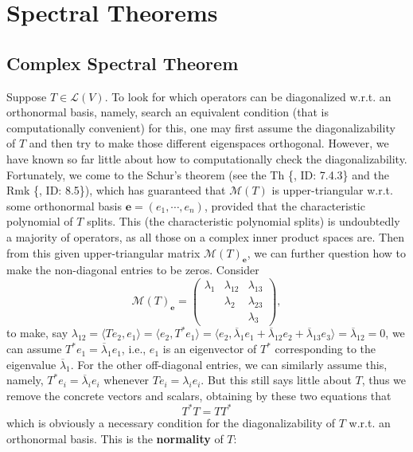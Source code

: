\documentclass{article}
\begin{document}
\section{Spectral Theorems}
\subsection{Complex Spectral Theorem}
Suppose $T\in\mathcal{L}(V)$. To look for which operators can be diagonalized w.r.t. an orthonormal basis, namely, search an equivalent condition (that is computationally convenient) for this, one may first assume the diagonalizability of $T$ and then try to make those different eigenspaces orthogonal. However, we have known so far little about how to computationally check the diagonalizability. Fortunately, we come to the Schur's theorem (see the Th \{, ID: 7.4.3\} and the Rmk \{, ID: 8.5\}), which has guaranteed that $\mathcal{M}(T)$ is upper-triangular w.r.t. some orthonormal basis $\pmb{e} = (e_1,\cdots,e_n)$, provided that the characteristic polynomial of $T$ splits. This (the characteristic polynomial splits) is undoubtedly a majority of operators, as all those on a complex inner product spaces are. Then from this given upper-triangular matrix $\mathcal{M}(T)_{\pmb{e}}$, we can further question how to make the non-diagonal entries to be zeros. Consider
\begin{equation}
    \mathcal{M}(T)_{\pmb{e}} = \begin{pmatrix}
        \lambda_1 & \lambda_{12} & \lambda_{13} \\
         & \lambda_2 & \lambda_{23} \\
         & & \lambda_3
    \end{pmatrix},
\end{equation}
to make, say $\lambda_{12} = \langle Te_2, e_1\rangle = \langle e_2, T^*e_1\rangle = \langle e_2, \overline{\lambda}_1e_1+\overline{\lambda}_{12}e_2+\overline{\lambda}_{13}e_3\rangle = \overline{\lambda}_{12}=0$, we can assume $T^*e_1 = \overline{\lambda}_1e_1$, i.e., $e_1$ is an eigenvector of $T^*$ corresponding to the eigenvalue $\overline{\lambda}_1$. For the other off-diagonal entries, we can similarly assume this, namely, $T^*e_i = \overline{\lambda}_ie_i$ whenever $Te_i = \lambda_ie_i$. But this still says little about $T$, thus we remove the concrete vectors and scalars, obtaining by these two equations that
$$ T^*T = TT^* $$
which is obviously a necessary condition for the diagonalizability of $T$ w.r.t. an orthonormal basis. This is the \textbf{normality} of $T$:
\end{document}
